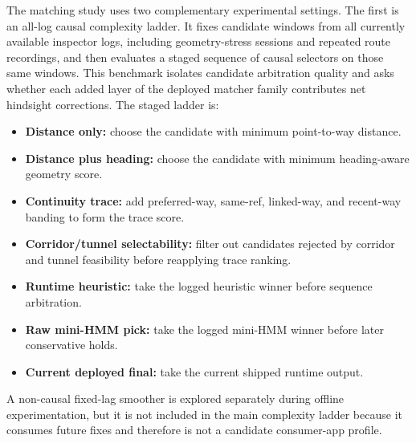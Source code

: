 \documentclass{article}
\begin{document}
The matching study uses two complementary experimental settings. The first is an all-log causal complexity ladder. It fixes candidate windows from all currently available inspector logs, including geometry-stress sessions and repeated route recordings, and then evaluates a staged sequence of causal selectors on those same windows. This benchmark isolates candidate arbitration quality and asks whether each added layer of the deployed matcher family contributes net hindsight corrections. The staged ladder is:
\begin{itemize}
\item \textbf{Distance only:} choose the candidate with minimum point-to-way distance.
\item \textbf{Distance plus heading:} choose the candidate with minimum heading-aware geometry score.
\item \textbf{Continuity trace:} add preferred-way, same-ref, linked-way, and recent-way banding to form the trace score.
\item \textbf{Corridor/tunnel selectability:} filter out candidates rejected by corridor and tunnel feasibility before reapplying trace ranking.
\item \textbf{Runtime heuristic:} take the logged heuristic winner before sequence arbitration.
\item \textbf{Raw mini-HMM pick:} take the logged mini-HMM winner before later conservative holds.
\item \textbf{Current deployed final:} take the current shipped runtime output.
\end{itemize}

A non-causal fixed-lag smoother is explored separately during offline experimentation, but it is not included in the main complexity ladder because it consumes future fixes and therefore is not a candidate consumer-app profile.
\end{document}
